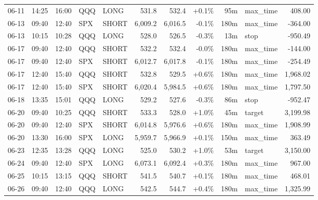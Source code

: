 \documentclass[11pt,a4paper,twoside]{article}
\begin{document}
\begin{center}
\begin{longtable}{>{\color{txtmain}}l l l l l r r r r >{\color{txtmain}}l r}
06-11 & 14:25 & 16:00 & QQQ & LONG & 531.8 & 532.4 & \textcolor{wingreen}{+0.1\%} & 95m & max\_time & \textcolor{wingreen}{408.00} \\
06-13 & 09:40 & 12:40 & SPX & SHORT & 6,009.2 & 6,016.5 & \textcolor{lossred}{-0.1\%} & 180m & max\_time & \textcolor{lossred}{-364.00} \\
06-13 & 10:15 & 10:28 & QQQ & LONG & 528.0 & 526.5 & \textcolor{lossred}{-0.3\%} & 13m & stop & \textcolor{lossred}{-950.49} \\
06-17 & 09:40 & 12:40 & QQQ & SHORT & 532.2 & 532.4 & \textcolor{lossred}{-0.0\%} & 180m & max\_time & \textcolor{lossred}{-144.00} \\
06-17 & 09:40 & 12:40 & SPX & SHORT & 6,012.7 & 6,017.8 & \textcolor{lossred}{-0.1\%} & 180m & max\_time & \textcolor{lossred}{-254.49} \\
06-17 & 12:40 & 15:40 & QQQ & SHORT & 532.8 & 529.5 & \textcolor{wingreen}{+0.6\%} & 180m & max\_time & \textcolor{wingreen}{1,968.02} \\
06-17 & 12:40 & 15:40 & SPX & SHORT & 6,020.4 & 5,984.5 & \textcolor{wingreen}{+0.6\%} & 180m & max\_time & \textcolor{wingreen}{1,797.50} \\
06-18 & 13:35 & 15:01 & QQQ & LONG & 529.2 & 527.6 & \textcolor{lossred}{-0.3\%} & 86m & stop & \textcolor{lossred}{-952.47} \\
06-20 & 09:40 & 10:25 & QQQ & SHORT & 533.3 & 528.0 & \textcolor{wingreen}{+1.0\%} & 45m & target & \textcolor{wingreen}{3,199.98} \\
06-20 & 09:40 & 12:40 & SPX & SHORT & 6,014.8 & 5,976.6 & \textcolor{wingreen}{+0.6\%} & 180m & max\_time & \textcolor{wingreen}{1,908.99} \\
06-20 & 13:30 & 16:00 & SPX & LONG & 5,959.7 & 5,966.9 & \textcolor{wingreen}{+0.1\%} & 150m & max\_time & \textcolor{wingreen}{363.49} \\
06-23 & 12:35 & 13:28 & QQQ & LONG & 525.0 & 530.2 & \textcolor{wingreen}{+1.0\%} & 53m & target & \textcolor{wingreen}{3,150.00} \\
06-24 & 09:40 & 12:40 & SPX & LONG & 6,073.1 & 6,092.4 & \textcolor{wingreen}{+0.3\%} & 180m & max\_time & \textcolor{wingreen}{967.00} \\
06-25 & 10:15 & 13:15 & QQQ & SHORT & 541.5 & 540.7 & \textcolor{wingreen}{+0.1\%} & 180m & max\_time & \textcolor{wingreen}{468.01} \\
06-26 & 09:40 & 12:40 & QQQ & LONG & 542.5 & 544.7 & \textcolor{wingreen}{+0.4\%} & 180m & max\_time & \textcolor{wingreen}{1,325.99} \\

\end{longtable}
\end{center}
\end{document}
